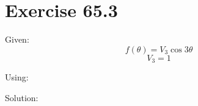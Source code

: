 \documentclass[a4paper, 10pt]{scrartcl}
\begin{document}
\section{Exercise 65.3}

Given:
\[f(\theta) = V_{3}\cos{3\theta}\]
\[V_{3} = 1\]

Using:

Solution:
\end{document}
